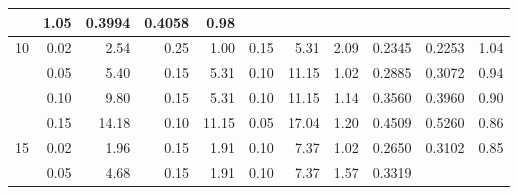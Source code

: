 \begin{table}[!htbp]
\begin{tabular}{r r r r r r r c r r c}
                                                        & 1.05     & 0.3994
                                                        & 0.4058   & 0.98
    \\
    \midrule
    10                                                  & 0.02     & 2.54                &
    0.25                                                &
    1.00                                                & 0.15     & 5.31
                                                        & 2.09     & 0.2345
                                                        & 0.2253   & 1.04
    \\
                                                        & 0.05     & 5.40                &
    0.15                                                &
    5.31                                                & 0.10     & 11.15
                                                        & 1.02     & 0.2885
                                                        & 0.3072   & 0.94
    \\
                                                        & 0.10     & 9.80                &
    0.15                                                &
    5.31                                                & 0.10     & 11.15
                                                        & 1.14     & 0.3560
                                                        & 0.3960   & 0.90
    \\
                                                        & 0.15     & 14.18               &
    0.10                                                &
    11.15                                               & 0.05     & 17.04
                                                        & 1.20     & 0.4509
                                                        & 0.5260   & 0.86
    \\
    \midrule
    15                                                  & 0.02     & 1.96                &
    0.15                                                &
    1.91                                                & 0.10     & 7.37
                                                        & 1.02     & 0.2650
                                                        & 0.3102   & 0.85
    \\
                                                        & 0.05     & 4.68                &
    0.15                                                &
    1.91                                                & 0.10     & 7.37
                                                        & 1.57     & 0.3319

\end{tabular}
\end{table}
